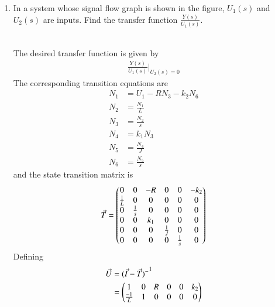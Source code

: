 \begin{enumerate}[label=\thesection.\arabic*.,ref=\thesection.\theenumi]
\item In a system whose signal flow graph is shown in the figure, $U_1(s)$ and $U_2(s)$ are inputs. Find the  transfer function $\frac{Y(s)}{U_1(s)}$.
%
\begin{figure}[!ht]
\begin{center}
		
		\resizebox{\columnwidth}{!}{}
	\end{center}
	\label{fig:ee18btech11041}
\end{figure}
\\
\solution The desired transfer function is given by
\begin{align}
    \frac{Y(s)}{U_1(s)}\Biggr|_{U_2(s)=0}
    \label{eq:ee18btech11041_1}
\end{align}
%
The corresponding transition equations are
\begin{align}
    N_1 &= U_1-RN_3-k_2N_6
    \label{eq:ee18btech11041_2}
\\
    N_2&=\frac{N_1}{L}
    \label{eq:ee18btech11041_4}
\\
    N_3&=\frac{N_2}{s}
    \label{eq:ee18btech11041_5}
\\
    N_4&=k_1N_3
    \label{eq:ee18btech11041_6}
\\
    N_5&=\frac{N_4}{J}
    \label{eq:ee18btech11041_7}
\\
    N_6&=\frac{N_5}{s}
    \label{eq:ee18btech11041_8}
\end{align}
and the state transition matrix is
\begin{align}
    \Vec{T} = \begin{pmatrix}0 & 0 & -R & 0 & 0 & -k_2\\
    \frac{1}{L} & 0 & 0 & 0 & 0 & 0\\
    0 & \frac{1}{s} & 0 & 0 & 0 & 0\\
    0 & 0 & k_1 & 0 & 0 & 0\\
    0 & 0 & 0 & \frac{1}{J} & 0 & 0\\
    0 & 0 & 0 & 0 & \frac{1}{s} & 0\end{pmatrix}
    \label{eq:ee18btech11041_9}
\end{align}    
Defining 
\begin{align}
    \Vec{U} &= {(\Vec{I}-\Vec{T})^-}^1
    \label{eq:ee18btech11041_10}
\\
     &= \begin{pmatrix}1 & 0 & R & 0 & 0 & k_2\\
    \frac{-1}{L} & 1 & 0 & 0 & 0 & 0\\
\end{pmatrix}
\end{align}
\end{enumerate}
